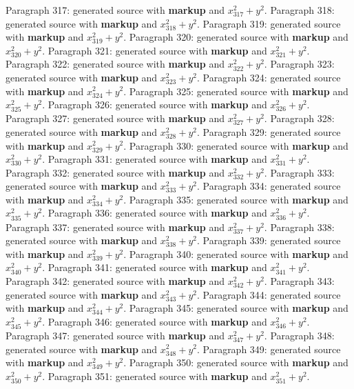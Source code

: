 \documentclass{article}
\begin{document}
Paragraph 317: generated source with \textbf{markup} and $x_{317}^2 + y^2$.
Paragraph 318: generated source with \textbf{markup} and $x_{318}^2 + y^2$.
Paragraph 319: generated source with \textbf{markup} and $x_{319}^2 + y^2$.
Paragraph 320: generated source with \textbf{markup} and $x_{320}^2 + y^2$.
Paragraph 321: generated source with \textbf{markup} and $x_{321}^2 + y^2$.
Paragraph 322: generated source with \textbf{markup} and $x_{322}^2 + y^2$.
Paragraph 323: generated source with \textbf{markup} and $x_{323}^2 + y^2$.
Paragraph 324: generated source with \textbf{markup} and $x_{324}^2 + y^2$.
Paragraph 325: generated source with \textbf{markup} and $x_{325}^2 + y^2$.
Paragraph 326: generated source with \textbf{markup} and $x_{326}^2 + y^2$.
Paragraph 327: generated source with \textbf{markup} and $x_{327}^2 + y^2$.
Paragraph 328: generated source with \textbf{markup} and $x_{328}^2 + y^2$.
Paragraph 329: generated source with \textbf{markup} and $x_{329}^2 + y^2$.
Paragraph 330: generated source with \textbf{markup} and $x_{330}^2 + y^2$.
Paragraph 331: generated source with \textbf{markup} and $x_{331}^2 + y^2$.
Paragraph 332: generated source with \textbf{markup} and $x_{332}^2 + y^2$.
Paragraph 333: generated source with \textbf{markup} and $x_{333}^2 + y^2$.
Paragraph 334: generated source with \textbf{markup} and $x_{334}^2 + y^2$.
Paragraph 335: generated source with \textbf{markup} and $x_{335}^2 + y^2$.
Paragraph 336: generated source with \textbf{markup} and $x_{336}^2 + y^2$.
Paragraph 337: generated source with \textbf{markup} and $x_{337}^2 + y^2$.
Paragraph 338: generated source with \textbf{markup} and $x_{338}^2 + y^2$.
Paragraph 339: generated source with \textbf{markup} and $x_{339}^2 + y^2$.
Paragraph 340: generated source with \textbf{markup} and $x_{340}^2 + y^2$.
Paragraph 341: generated source with \textbf{markup} and $x_{341}^2 + y^2$.
Paragraph 342: generated source with \textbf{markup} and $x_{342}^2 + y^2$.
Paragraph 343: generated source with \textbf{markup} and $x_{343}^2 + y^2$.
Paragraph 344: generated source with \textbf{markup} and $x_{344}^2 + y^2$.
Paragraph 345: generated source with \textbf{markup} and $x_{345}^2 + y^2$.
Paragraph 346: generated source with \textbf{markup} and $x_{346}^2 + y^2$.
Paragraph 347: generated source with \textbf{markup} and $x_{347}^2 + y^2$.
Paragraph 348: generated source with \textbf{markup} and $x_{348}^2 + y^2$.
Paragraph 349: generated source with \textbf{markup} and $x_{349}^2 + y^2$.
Paragraph 350: generated source with \textbf{markup} and $x_{350}^2 + y^2$.
Paragraph 351: generated source with \textbf{markup} and $x_{351}^2 + y^2$.
\end{document}
